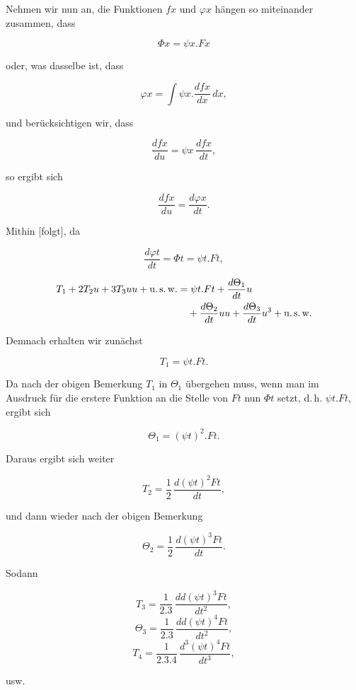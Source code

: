 %

Nehmen wir nun an, die Funktionen $fx$ und $\varphi x$ hängen so miteinander zusammen, dass

\[ \Phi x = \psi x \mathord{.} Fx \]

\noindent oder, was dasselbe ist, dass

\[ \varphi x = \int \psi x \mathord{.} \frac{dfx}{dx}\,dx, \]

\noindent und berücksichtigen wir, dass

\[ \frac{dfx}{du} = \psi x\,\frac{dfx}{dt}, \]

\noindent so ergibt sich

\[ \frac{dfx}{du} = \frac{d\varphi x}{dt}. \]

\noindent Mithin [folgt], da

\[ \frac{d\varphi t}{dt} = \Phi t = \psi t \mathord{.} Ft, \]

\[\begin{aligned}
T_1 + 2 T_2 u + 3 T_3 uu + \text{u.\,s.\,w.}
&= \psi t\mathord{.}Ft+\frac{d\Theta_1}{dt}u\\
&\quad+\frac{d\Theta_2}{dt}uu+\frac{d\Theta_3}{dt}u^3+\text{u.\,s.\,w.}
\end{aligned}\]

\noindent Demnach erhalten wir zunächst

\[ T_1 = \psi t \mathord{.} Ft. \]

\noindent Da nach der obigen Bemerkung $T_1$ in $\Theta_1$ übergehen muss, wenn man im Ausdruck für die erstere Funktion an die Stelle von $Ft$ nun $\Phi t$ setzt, d.\,h. $\psi t \mathord{.} Ft$, ergibt sich

\[ \Theta_1 = (\psi t)^2 \mathord{.} Ft. \]

\noindent Daraus ergibt sich weiter

\[ T_2 = \frac{1}{2}\,\frac{d(\psi t)^2 Ft}{dt}, \]

\noindent und dann wieder nach der obigen Bemerkung

\[ \Theta_2 = \frac{1}{2}\,\frac{d(\psi t)^3 Ft}{dt}. \]

\noindent Sodann

\[ T_3 = \frac{1}{2.3}\,\frac{dd(\psi t)^3 Ft}{dt^2}, \]
\[ \Theta_3 = \frac{1}{2.3}\,\frac{dd(\psi t)^4 Ft}{dt^2}, \]
\[ T_4 = \frac{1}{2.3.4}\,\frac{d^3(\psi t)^4 Ft}{dt^3}, \]

\begin{center}usw.\end{center}
